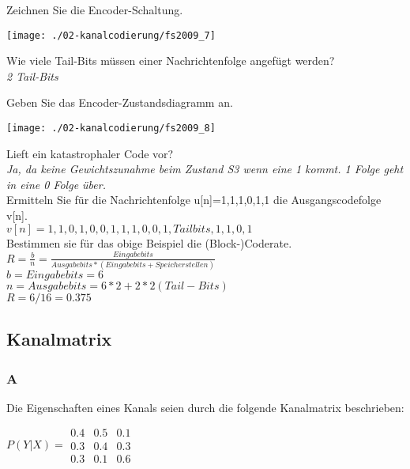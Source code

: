 Zeichnen Sie die Encoder-Schaltung.
\begin{center}
    \vspace{-8pt}
    \texttt{[image: ./02-kanalcodierung/fs2009\_7]}
    \vspace{-8pt}
\end{center}

Wie viele Tail-Bits müssen einer Nachrichtenfolge angefügt werden?\\
\textit{2 Tail-Bits}\\

\columnbreak

Geben Sie das Encoder-Zustandsdiagramm an.
\begin{center}
    \vspace{-8pt}
    \texttt{[image: ./02-kanalcodierung/fs2009\_8]}
    \vspace{-8pt}
\end{center}

Lieft ein katastrophaler Code vor?\\
\textit{Ja, da keine Gewichtszunahme beim Zustand S3 wenn eine 1 kommt. 1 Folge geht in eine 0 Folge über.}\\

Ermitteln Sie für die Nachrichtenfolge {u[n]}={1,1,1,0,1,1} die Ausgangscodefolge {v[n]}.\\
${v[n]}={1,1,0,1,0,0,1,1,1,0,0,1,Tailbits,1,1,0,1}$\\

Bestimmen sie für das obige Beispiel die (Block-)Coderate.\\
$R=\frac{b}{n}=\frac{Eingabebits}{Ausgabebits*(Eingabebits+Speicherstellen)}$\\
$b=Eingabebits=6$\\
$n=Ausgabebits=6*2+2*2 (Tail-Bits)$\\
$R=6/16=0.375$

\subsection{Kanalmatrix}
\subsubsection{A}
Die Eigenschaften eines Kanals seien durch die folgende Kanalmatrix beschrieben: 

$P(Y|X) = \begin{matrix}
    0.4 & 0.5 & 0.1\\
    0.3 & 0.4 & 0.3\\
    0.3 & 0.1 & 0.6
\end{matrix}$


